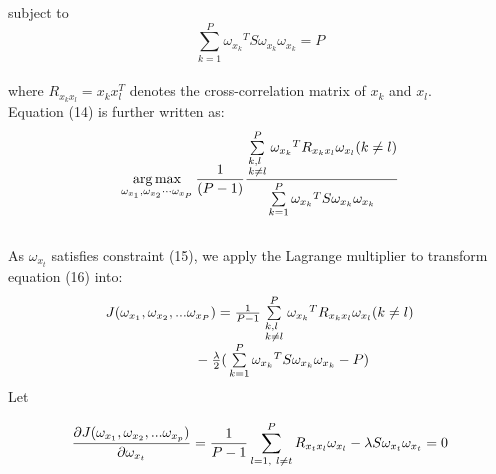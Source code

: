 \documentclass[journal]{IEEEtran}
\begin{document}
 subject to \begin{equation} \sum\limits_{{k=1}}^{P} {{\omega_{{x_k}}}^TS{\omega_{{x_k}}}{\omega_{{x_k}}}}  = P \end{equation}\\ where
${R_{x_kx_l}} = x_k{x_l^T}$ denotes the cross-correlation matrix of $x_k$ and $x_l$.\\\indent
Equation (14) is further written as:
\begin {equation}\mathop {\arg \max}\limits_{{\omega _{x_1}},{\omega _{x_2}} \cdots {\omega _{x_P}}}  \frac{1}{{(P - 1)}}\frac{{\sum\limits_{\scriptstyle k,l\hfill \atop
  \scriptstyle {\rm{ }}k \ne l \hfill}^{P} {{\omega _{x_k}}^T{R_{x_kx_l}}{\omega _{x_l}}} {\rm{  (}}k \ne l{\rm{)}}}}{{\sum\limits_{k = {1}}^{P} {{\omega_{{x_k}}}^TS{\omega_{x_k}}{\omega_{{x_k}}}} }} \end{equation} \\\indent As ${\omega _{x_t}}$ satisfies constraint (15), we apply the Lagrange multiplier to transform equation (16) into:
\begin{equation} \begin{array}{l}
 J({\omega _{x_1}},{\omega _{x_2}},...{\omega _{x_P}}) = \frac{1}{{P - 1}}\sum\limits_{\scriptstyle k,l \hfill \atop
  \scriptstyle {\rm{ }}k \ne l \hfill}^{P} {{\omega _{x_k}}^T{R_{x_kx_l}}{\omega _{x_l}}} {\rm{  (}}k \ne l{\rm{)}} \\
 {\rm{~~~~~~~~~~~~~~~~~~~}} - \frac{\lambda}{2} {\rm{(}}\sum\limits_{k = 1}^{P} {{\omega _{x_k}}^TS{\omega_{x_k}}{\omega _{x_k}}}  - P{\rm{)}} \\
 \end{array} \end{equation}
Let
\begin{small}
\begin{equation}{\frac{{\partial J({\omega _{{x_1}}},{\omega _{{x_2}}},...{\omega _{{x_p}}})}}{{\partial {\omega _{{x_t}}}}} =\frac{1}{{P - 1}}\sum\limits_{l = 1,\\\ l \ne t}^P {{R_{{x_t}{x_l}}}{\omega _{{x_l}}}}  - \lambda S{\omega _{{x_t}}}{\omega _{{x_t}}}}=0
\end{equation} \end{small}
\end{document}
